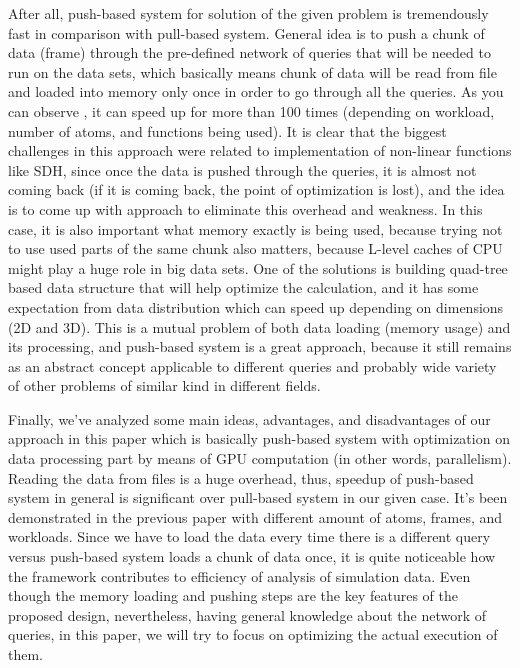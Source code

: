 \documentclass[12pt,letterpaper]{report}
\begin{document}
After all, push-based system for solution of the given problem is tremendously fast in comparison with pull-based system. General idea is to push a chunk of data (frame) through the pre-defined network of queries that will be needed to run on the data sets, which basically means chunk of data will be read from file and loaded into memory only once in order to go through all the queries. As you can observe \cite{mainPaper}, it can speed up for more than 100 times (depending on workload, number of atoms, and functions being used). It is clear that the biggest challenges in this approach were related to implementation of non-linear functions like SDH, since once the data is pushed through the queries, it is almost not coming back (if it is coming back, the point of optimization is lost), and the idea is to come up with approach to eliminate this overhead and weakness. In this case, it is also important what memory exactly is being used, because trying not to use used parts of the same chunk also matters, because L-level caches of CPU might play a huge role in big data sets. One of the solutions is building quad-tree based data structure that will help optimize the calculation, and it has some expectation from data distribution which can speed up depending on dimensions (2D and 3D). This is a mutual problem of both data loading (memory usage) and its processing, and push-based system is a great approach, because it still remains as an abstract concept applicable to different queries and probably wide variety of other problems of similar kind in different fields.

Finally, we've analyzed some main ideas, advantages, and disadvantages of our approach in this paper which is basically push-based system with optimization on data processing part by means of GPU computation (in other words, parallelism). Reading the data from files is a huge overhead, thus, speedup of push-based system in general is significant over pull-based system in our given case. 
It's been demonstrated in the previous paper with different amount of atoms, frames, and workloads. Since we have to load the data every time there is a different query versus push-based system loads a chunk of data once, it is quite noticeable how the framework contributes to efficiency of analysis of simulation data. Even though the memory loading and pushing steps are the key features of the proposed design, nevertheless, having general knowledge about the network of queries, in this paper, we will try to focus on optimizing the actual execution of them.
\end{document}
